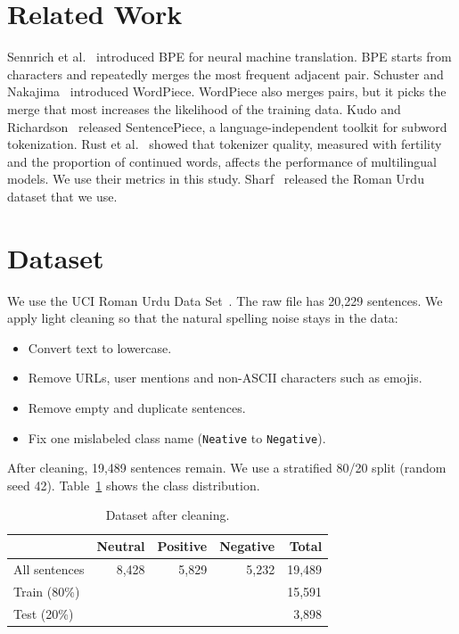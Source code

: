 \documentclass[11pt,a4paper]{article}
\begin{document}
\section{Related Work}
Sennrich et al.~\cite{sennrich2016} introduced BPE for neural machine translation. BPE starts from characters and repeatedly merges the most frequent adjacent pair. Schuster and Nakajima~\cite{schuster2012} introduced WordPiece. WordPiece also merges pairs, but it picks the merge that most increases the likelihood of the training data. Kudo and Richardson~\cite{kudo2018} released SentencePiece, a language-independent toolkit for subword tokenization. Rust et al.~\cite{rust2021} showed that tokenizer quality, measured with fertility and the proportion of continued words, affects the performance of multilingual models. We use their metrics in this study. Sharf~\cite{sharf2018} released the Roman Urdu dataset that we use.

\section{Dataset}
We use the UCI Roman Urdu Data Set~\cite{sharf2018}. The raw file has 20{,}229 sentences. We apply light cleaning so that the natural spelling noise stays in the data:
\begin{itemize}[leftmargin=*]
  \item Convert text to lowercase.
  \item Remove URLs, user mentions and non-ASCII characters such as emojis.
  \item Remove empty and duplicate sentences.
  \item Fix one mislabeled class name (\texttt{Neative} to \texttt{Negative}).
\end{itemize}
After cleaning, 19{,}489 sentences remain. We use a stratified 80/20 split (random seed 42). Table~\ref{tab:data} shows the class distribution.

\begin{table}[H]
\centering
\begin{tabular}{lrrrr}
\toprule
 & \textbf{Neutral} & \textbf{Positive} & \textbf{Negative} & \textbf{Total} \\
\midrule
All sentences & 8{,}428 & 5{,}829 & 5{,}232 & 19{,}489 \\
Train (80\%) & & & & 15{,}591 \\
Test (20\%) & & & & 3{,}898 \\
\bottomrule
\end{tabular}
\caption{Dataset after cleaning.}
\label{tab:data}
\end{table}
\end{document}
